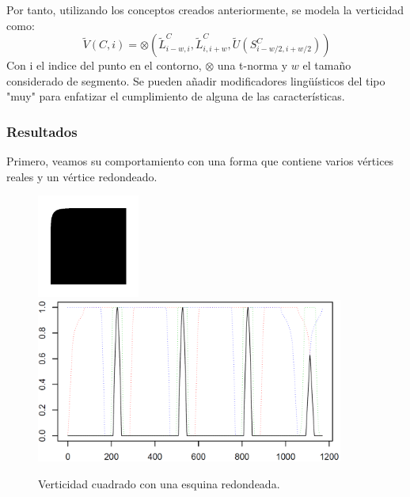 Por tanto, utilizando los conceptos creados anteriormente, se modela la verticidad como:\\

\[
\ \tilde{V}(C,i) = \otimes \left(\tilde{L}^C_{i-w,i}, \tilde{L}^C_{i,i+w},  \tilde{U}(S^C_{i-w/2,i+w/2})   \right)
\]
Con i el indice del punto en el contorno, $ \otimes $ una t-norma y $w$ el tamaño considerado de segmento. Se pueden añadir modificadores lingüísticos del tipo "muy" para enfatizar el cumplimiento de alguna de las características.

\subsubsection{Resultados}

Primero, veamos su comportamiento con una forma que contiene varios vértices reales y un vértice redondeado.\\

\begin{figure}[H]
\begin{center}

\includegraphics[width=0.3\textwidth]{img/fig4.png}
\newline
\includegraphics[width=0.9\textwidth]{img/vert-fig04-novvery.png}
\end{center}

\caption{Verticidad cuadrado con una esquina redondeada.}
\label{fig11}
\end{figure}

